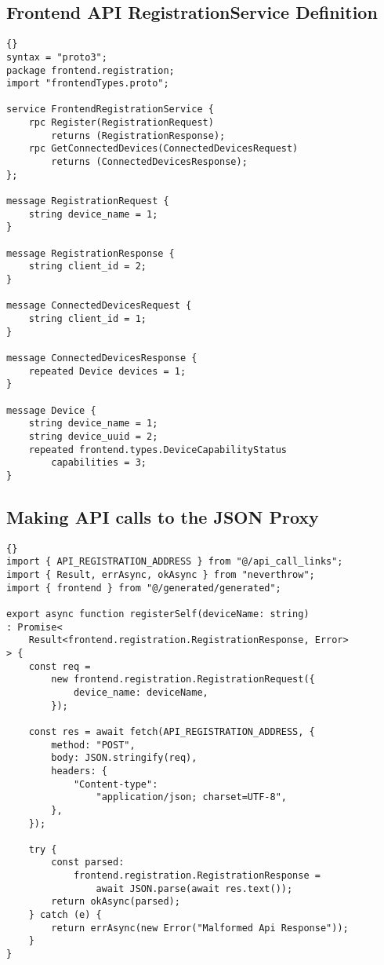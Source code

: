 \pagebreak
\subsection{Frontend API RegistrationService Definition} \label{chap:A2:frontendApiDefinition}
\begin{lstlisting}[language=protobuf3, style=boxed, showstringspaces=false]{}
syntax = "proto3";
package frontend.registration;
import "frontendTypes.proto";

service FrontendRegistrationService {
    rpc Register(RegistrationRequest) 
        returns (RegistrationResponse);
    rpc GetConnectedDevices(ConnectedDevicesRequest)
        returns (ConnectedDevicesResponse);
};

message RegistrationRequest {
    string device_name = 1;
}

message RegistrationResponse {
    string client_id = 2;
}

message ConnectedDevicesRequest {
    string client_id = 1;
}

message ConnectedDevicesResponse {
    repeated Device devices = 1;
}

message Device {
    string device_name = 1;
    string device_uuid = 2;
    repeated frontend.types.DeviceCapabilityStatus 
        capabilities = 3;
}
\end{lstlisting}

\pagebreak
\subsection{Making API calls to the JSON Proxy} \label{chap:A2:apicallsjsonproxy}
\begin{lstlisting}[language=ES6, style=boxed, showstringspaces=false]{}
import { API_REGISTRATION_ADDRESS } from "@/api_call_links";
import { Result, errAsync, okAsync } from "neverthrow";
import { frontend } from "@/generated/generated";

export async function registerSelf(deviceName: string)
: Promise<
    Result<frontend.registration.RegistrationResponse, Error>
> {
    const req = 
        new frontend.registration.RegistrationRequest({
            device_name: deviceName,
        });

    const res = await fetch(API_REGISTRATION_ADDRESS, {
        method: "POST",
        body: JSON.stringify(req),
        headers: {
            "Content-type": 
                "application/json; charset=UTF-8",
        },
    });

    try {
        const parsed: 
            frontend.registration.RegistrationResponse =
                await JSON.parse(await res.text());
        return okAsync(parsed);
    } catch (e) {
        return errAsync(new Error("Malformed Api Response"));
    }
}
\end{lstlisting}

